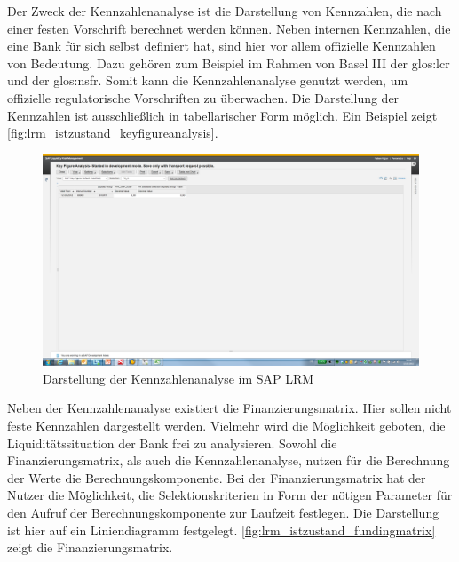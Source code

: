 \begin{onehalfspacing}
Der Zweck der Kennzahlenanalyse ist die Darstellung von Kennzahlen, die nach einer festen Vorschrift berechnet werden können. Neben internen Kennzahlen, die eine Bank für sich selbst definiert hat, sind hier vor allem offizielle Kennzahlen von Bedeutung. Dazu gehören zum Beispiel im Rahmen von Basel III der \gls{glos:lcr} und der \gls{glos:nsfr}. Somit kann die Kennzahlenanalyse genutzt werden, um offizielle regulatorische Vorschriften zu überwachen. Die Darstellung der Kennzahlen ist ausschließlich in tabellarischer Form möglich. Ein Beispiel zeigt \vref{fig:lrm_istzustand_keyfigureanalysis}.

\begin{figure}[h]
\centering
\setlength{\unitlength}{1mm}
\includegraphics[width=15cm]{images/KeyFigureAnalysis_Example.png}
\caption{Darstellung der Kennzahlenanalyse im SAP LRM\label{fig:lrm_istzustand_keyfigureanalysis}}
\end{figure} 

Neben der Kennzahlenanalyse existiert die Finanzierungsmatrix. Hier sollen nicht feste Kennzahlen dargestellt werden. Vielmehr wird  die Möglichkeit geboten, die Liquiditätssituation der Bank frei zu analysieren. Sowohl die Finanzierungsmatrix, als auch die Kennzahlenanalyse, nutzen für die Berechnung der Werte die Berechnungskomponente. Bei der Finanzierungsmatrix hat der Nutzer die Möglichkeit, die Selektionskriterien in Form der nötigen Parameter für den Aufruf der Berechnungskomponente zur Laufzeit festlegen. Die Darstellung ist hier auf ein Liniendiagramm festgelegt. \vref{fig:lrm_istzustand_fundingmatrix} zeigt die Finanzierungsmatrix.


\end{onehalfspacing}
